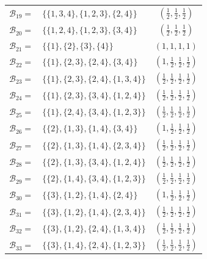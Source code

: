 \documentclass[10pt,a4paper,titlepage]{article}
\theoremstyle{plain}
\theoremstyle{definition}
\begin{document}
\begin{center}
\begin{tabular}{ | r l | c | }
    $\mathcal{B}_{19} =$ & $\{\{1,3,4\}, \{1,2,3\}, \{2,4\}\}$ & $\left(\frac{1}{2}, \frac{1}{2}, \frac{1}{2}\right)$\\[2pt]
    $\mathcal{B}_{20} =$ & $\{\{1,2,4\}, \{1,2,3\}, \{3,4\}\}$ & $\left(\frac{1}{2}, \frac{1}{2}, \frac{1}{2}\right)$\\[2pt]
    $\mathcal{B}_{21} =$ & $\{\{1\}, \{2\}, \{3\}, \{4\}\}$ & $\left(1, 1, 1, 1\right)$\\[2pt]
    $\mathcal{B}_{22} =$ & $\{\{1\}, \{2,3\}, \{2,4\}, \{3,4\}\}$ & $\left(1, \frac{1}{2}, \frac{1}{2}, \frac{1}{2}\right)$\\[2pt]
    $\mathcal{B}_{23} =$ & $\{\{1\}, \{2,3\}, \{2,4\}, \{1,3,4\}\}$ & $\left(\frac{1}{2}, \frac{1}{2}, \frac{1}{2}, \frac{1}{2}\right)$\\[2pt]
    $\mathcal{B}_{24} =$ & $\{\{1\}, \{2,3\}, \{3,4\}, \{1,2,4\}\}$ & $\left(\frac{1}{2}, \frac{1}{2}, \frac{1}{2}, \frac{1}{2}\right)$\\[2pt]
    $\mathcal{B}_{25} =$ & $\{\{1\}, \{2,4\}, \{3,4\}, \{1,2,3\}\}$ & $\left(\frac{1}{2}, \frac{1}{2}, \frac{1}{2}, \frac{1}{2}\right)$\\[2pt]
    $\mathcal{B}_{26} =$ & $\{\{2\}, \{1,3\}, \{1,4\}, \{3,4\}\}$ & $\left(1, \frac{1}{2}, \frac{1}{2}, \frac{1}{2}\right)$\\[2pt]
    $\mathcal{B}_{27} =$ & $\{\{2\}, \{1,3\}, \{1,4\}, \{2,3,4\}\}$ & $\left(\frac{1}{2}, \frac{1}{2}, \frac{1}{2}, \frac{1}{2}\right)$\\[2pt]
    $\mathcal{B}_{28} =$ & $\{\{2\}, \{1,3\}, \{3,4\}, \{1,2,4\}\}$ & $\left(\frac{1}{2}, \frac{1}{2}, \frac{1}{2}, \frac{1}{2}\right)$\\[2pt]
    $\mathcal{B}_{29} =$ & $\{\{2\}, \{1,4\}, \{3,4\}, \{1,2,3\}\}$ & $\left(\frac{1}{2}, \frac{1}{2}, \frac{1}{2}, \frac{1}{2}\right)$\\[2pt]
    $\mathcal{B}_{30} =$ & $\{\{3\}, \{1,2\}, \{1,4\}, \{2,4\}\}$ & $\left(1, \frac{1}{2}, \frac{1}{2}, \frac{1}{2}\right)$\\[2pt]
    $\mathcal{B}_{31} =$ & $\{\{3\}, \{1,2\}, \{1,4\}, \{2,3,4\}\}$ & $\left(\frac{1}{2}, \frac{1}{2}, \frac{1}{2}, \frac{1}{2}\right)$\\[2pt]
    $\mathcal{B}_{32} =$ & $\{\{3\}, \{1,2\}, \{2,4\}, \{1,3,4\}\}$ & $\left(\frac{1}{2}, \frac{1}{2}, \frac{1}{2}, \frac{1}{2}\right)$\\[2pt]
    $\mathcal{B}_{33} =$ & $\{\{3\}, \{1,4\}, \{2,4\}, \{1,2,3\}\}$ & $\left(\frac{1}{2}, \frac{1}{2}, \frac{1}{2}, \frac{1}{2}\right)$\\[2pt]

\end{tabular}
\end{center}
\end{document}
